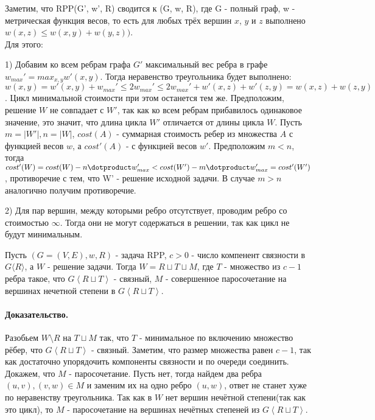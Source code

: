 Заметим, что \textsf{RPP}(G', w', R) сводится к (G, w, R), где G - полный граф, w - метрическая функция весов, то есть для любых трёх вершин $x$, $y$ и $z$ выполнено $w(x, z) \leq w(x, y) + w(y, z))$. \\Для этого: \\
 \par1) Добавим ко всем ребрам графа $G'$ максимальный вес ребра в графе $w_{max}' = max_{x,y} w'(x, y)$. Тогда неравенство треугольника будет выполнено: $w(x, y) = w'(x, y) + w_{max}' \leq 2w_{max}' \leq 2w_{max}' + w'(x, z) + w'(z, y) = w(x, z) + w(z, y)$. Цикл минимальной стоимости при этом останется тем же. Предположим, решение $W$ не совпадает с $W'$, так как ко всем ребрам прибавилось одинаковое значение, это значит, что длина цикла $W'$ отличается от длины цикла $W$. Пусть $ m = |W'|, n =|W|$, $cost(A)$ - суммарная стоимость ребер из множества $A$ с функцией весов $w$, а $cost'(A)$ - с функцией весов $w'$. Предположим $m < n$, тогда 
$cost'(W) = cost(W) - n \dotproduct w_{max}' < cost(W') - m \dotproduct w_{max}' = cost'(W')$, противоречие с тем, что W' - решение исходной задачи. В случае $m > n$ аналогично получим противоречие.\\
\par2) Для пар вершин, между которыми ребро отсутствует, проводим ребро со стоимостью $\infty$. Тогда они не могут содержаться в решении, так как цикл не будут минимальным.

\begin{lemma}
Пусть $(G = (V, E), w, R)$ - задача \textsf{RPP}, $c > 0$ - число компенент связности в $G\langle R \rangle$, а $W$ - решение задачи. Тогда $W=R \sqcup T \sqcup M$, где  
$T$ - множество из $ c - 1$ ребра такое, что  $G \left\langle R \sqcup T \right\rangle$ - связный, 
$M$ - совершенное паросочетание на вершинах нечетной степени в $G \left\langle R \sqcup T \right\rangle$.

\end{lemma}
\paragraph{Доказательство.}
Разобьем $W \setminus R$ на $T \sqcup M$ так, что $T$ - минимальное по включению множество рёбер, что $G \left\langle R \sqcup T \right\rangle$ - связный. Заметим, что размер множества равен $c - 1$, так как достаточно упорядочить компоненты связности и по очереди соединить.  
Докажем, что $M$ - паросочетание. Пусть нет, тогда найдем два ребра $(u,v),(v,w) \in M$ и заменим их на одно ребро $(u, w)$, ответ не станет хуже по неравенству треугольника. Так как в $W$ нет вершин нечётной степени(так как это цикл), то $M$ - паросочетание на вершинах нечётных степеней из $G \left\langle R \sqcup T \right\rangle$.

